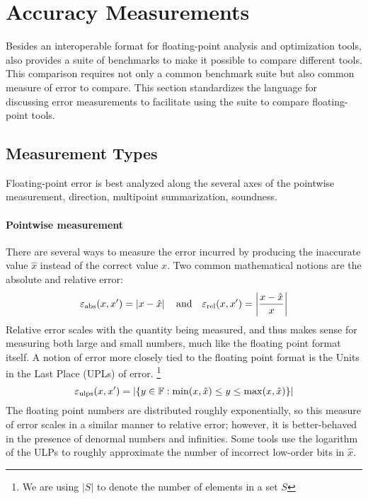 \documentclass[main.tex]{subfiles}
\begin{document}
\section{Accuracy Measurements}
\label{sec:measure}

Besides an interoperable format
  for floating-point analysis and optimization tools,
  \name also provides a suite of benchmarks
  to make it possible to compare different tools.
This comparison requires not only a common benchmark suite
  but also common measure of error to compare.
This section standardizes the language
  for discussing error measurements
  to facilitate using the \name suite to compare floating-point tools.

\subsection{Measurement Types}

Floating-point error is best analyzed along the several axes
  of the pointwise measurement, direction,
  multipoint summarization, soundness.

\paragraph{Pointwise measurement}

There are several ways to measure the error incurred
  by producing the inaccurate value $\hat x$ instead of the correct value $x$.
Two common mathematical notions are the absolute and relative error:
\begin{equation*}
  \varepsilon_{\text{abs}}(x, x') = \left|x - \hat x\right|
  \quad \text{and} \quad
  \varepsilon_{\text{rel}}(x, x') = \left|\frac{x - \hat x}{x}\right|
\end{equation*}
Relative error scales with the quantity being measured,
  and thus makes sense for measuring both large and small numbers,
  much like the floating point format itself.
A notion of error more closely tied to the floating point format
  is the Units in the Last Place (UPLs) of error.%
\footnote{We are using $|S|$ to denote the number of elements in a set $S$}
\[
\varepsilon_{\text{ulps}}(x, x') = |\{ y \in \mathbb{F} : \min(x, \hat x) \le y \le \max(x, \hat x)
\}|
\]
The floating point numbers are distributed roughly exponentially, so
this measure of error scales in a similar manner to relative
error; however, it is better-behaved in the presence of denormal
numbers and infinities.
Some tools use the logarithm of the ULPs to roughly approximate
the number of incorrect low-order bits in $\hat x$.
\end{document}
